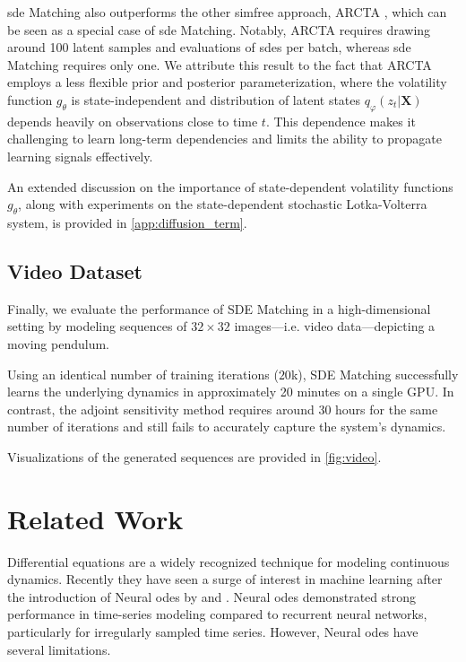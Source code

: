 \documentclass{article}
\def\X{\mathbf{X}}
\def\ph{\varphi}
\def\th{\theta}
\theoremstyle{plain}
\theoremstyle{definition}
\theoremstyle{remark}
\begin{document}
\gls{sde} Matching also outperforms the other \gls{simfree} approach, ARCTA \citet{course2024amortized}, which can be seen as a special case of \gls{sde} Matching. Notably, ARCTA requires drawing around 100 latent samples and evaluations of \glspl{sde} per batch, whereas \gls{sde} Matching requires only one. We attribute this result to the fact that ARCTA employs a less flexible prior and posterior parameterization, where the volatility function $g_\th$ is state-independent and distribution of latent states $q_\ph(z_t|\X)$ depends heavily on observations close to time $t$. This dependence makes it challenging to learn long-term dependencies and limits the ability to propagate learning signals effectively.


An extended discussion on the importance of state-dependent volatility functions $g_\th$, along with experiments on the state-dependent stochastic Lotka-Volterra system, is provided in \cref{app:diffusion_term}.


\subsection{Video Dataset}
\label{sec:video}

Finally, we evaluate the performance of SDE Matching in a high-dimensional setting by modeling sequences of $32 \times 32$ images—i.e. video data—depicting a moving pendulum.

Using an identical number of training iterations ($20$k), SDE Matching successfully learns the underlying dynamics in approximately 20 minutes on a single GPU. In contrast, the adjoint sensitivity method requires around 30 hours for the same number of iterations and still fails to accurately capture the system's dynamics.

Visualizations of the generated sequences are provided in \cref{fig:video}.


\section{Related Work}
\label{sec:related_work}


Differential equations are a widely recognized technique for modeling continuous dynamics. Recently they have seen a surge of interest in machine learning after the introduction of Neural \glspl{ode} by \citet{chen2018neural} and \citet{rubanova2019latent}. Neural \glspl{ode} demonstrated strong performance in time-series modeling compared to recurrent neural networks, particularly for irregularly sampled time series. However, Neural \glspl{ode} have several limitations.
\end{document}
